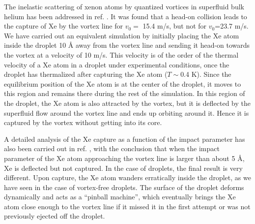  
 The inelastic scattering of xenon atoms by quantized vortices in superfluid bulk helium has been addressed in ref. \cite{Psh16}.
  It was found that
  a head-on collision leads to the capture of Xe by the vortex line for $v_0=$ 15.4 m/s, but not  for $v_0$=23.7 m/s.
We have carried out  an equivalent  simulation by initially placing
 the Xe atom  inside the droplet 10 \AA{} away
from the vortex line and   sending it  head-on towards the vortex at a velocity of 10 m/s.
This velocity  is of the order of the thermal velocity of a Xe atom in a droplet under experimental conditions,
once the droplet has thermalized after capturing the Xe atom  ($T \sim$0.4 K).\cite{Toe04} 
Since the equilibrium position of  the Xe atom is at the center of the droplet, it  moves to this region and remains there during the rest of the simulation.
In this region of the droplet, the Xe atom is also attracted by the vortex, but it is deflected by the superfluid flow around the vortex line and ends up orbiting around it.
 Hence it is captured by the vortex without getting into its  core.

A detailed  analysis of the Xe capture as a function of the impact parameter has also been  carried out in ref. \cite{Psh16}, with the conclusion that when the impact parameter 
 of the Xe atom approaching the vortex line is larger than about 5 \AA{}, Xe is deflected but not captured.\cite{Psh16}
  In the case of droplets, the final result is very different.
Upon capture, the Xe atom wanders erratically inside the droplet,  as we have seen in the case of vortex-free droplets.
 The surface of the droplet deforms dynamically and acts as
 a ``pinball machine'',  which  eventually brings the Xe atom close enough to the vortex line if it missed it
 in the first attempt or was not previously ejected off the droplet. 

